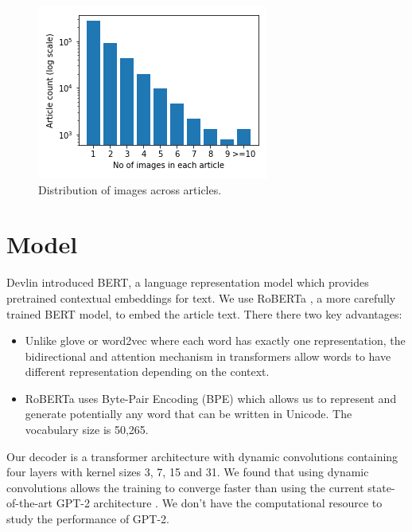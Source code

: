 \documentclass[10pt,twocolumn,letterpaper]{article}
\begin{document}
\begin{figure}[t]
   \begin{center}
   \includegraphics[width=0.8\linewidth]{figures/caption_dist.png}
   \end{center}
      \caption{Distribution of images across articles.}
   \label{fig:dist}
   \end{figure}

\section{Model}

Devlin \etal \cite{Devlin2019BERT} introduced BERT, a language representation
model which provides pretrained contextual embeddings for text. We use
RoBERTa \cite{Liu2019RoBERTaAR}, a more carefully trained BERT model, to
embed the article text. There there two key advantages:

\begin{itemize}
   \item Unlike glove \cite{Pennington2014Glove} or word2vec
   \cite{Mikolov2013DistributedRO} where each word has exactly one
   representation, the bidirectional and attention mechanism in transformers
   allow words to have different representation depending on the context.
   \item RoBERTa uses Byte-Pair Encoding (BPE)
   \cite{Sennrich2015NeuralMT,Radford2019LanguageMA} which allows us to
   represent and generate potentially any word that can be written in
   Unicode. The vocabulary size is 50,265.
\end{itemize}

Our decoder is a transformer architecture with dynamic convolutions
\cite{Wu2018PayLA} containing four layers with kernel sizes 3, 7, 15 and 31. We
found that using dynamic convolutions allows the training to converge faster
than using the current state-of-the-art GPT-2 architecture
\cite{Radford2019LanguageMA}. We don't have the computational resource to study
the performance of GPT-2.
\end{document}
